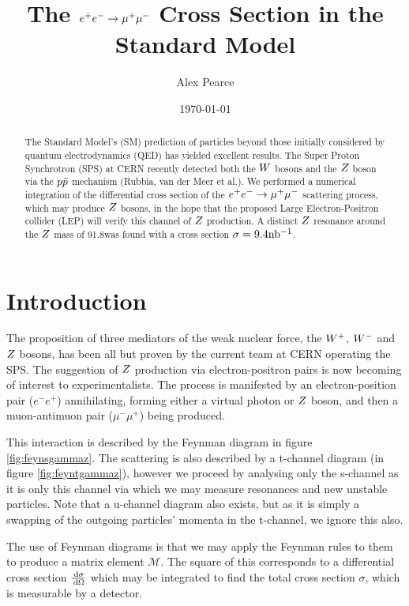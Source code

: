 \documentclass[]{article}
\begin{document}
\title{The $\ee \rarrow \mumu$ Cross Section in the Standard Model}
\author{Alex Pearce}
\date{\today}
\maketitle


\begin{abstract}
The Standard Model's (SM) prediction of particles beyond those initially considered by quantum electrodynamics (QED) has yielded excellent results. The Super Proton Synchrotron (SPS) at CERN recently detected both the $W $ bosons and the $Z $ boson via the $p\bar{p}$ mechanism (Rubbia, van der Meer et al.). We performed a numerical integration of the differential cross section of the $\ee \rarrow \mumu$ scattering process, which may produce $Z $ bosons, in the hope that the proposed Large Electron-Positron collider (LEP) will verify this channel of $Z $ production. A distinct $Z $ resonance around the $Z $ mass of 91.8\GeV was found with a cross section $\sigma=9.4\mbox{nb$^{-1}$} $.
\end{abstract}




\section{Introduction}\label{sec:intro}

The proposition of three mediators of the weak nuclear force, the $W^+ $, $W^- $ and $Z $ bosons, has been all but proven by the current team at CERN operating the SPS. The suggestion of $Z $ production via electron-positron pairs is now becoming of interest to experimentalists. The process is manifested by an electron-position pair ($e^{-}e^{+}$) annihilating, forming either a virtual photon or $Z $ boson, and then a muon-antimuon pair ($\mu^{-}\mu^{+}$) being produced.

This interaction is described by the Feynman diagram in figure \ref{fig:feynsgammaz}. The scattering is also described by a t-channel diagram (in figure \ref{fig:feyntgammaz}), however we proceed by analysing only the s-channel as it is only this channel via which we may measure resonances and new unstable particles. Note that a u-channel diagram also exists, but as it is simply a swapping of the outgoing particles' momenta in the t-channel, we ignore this also.

The use of Feynman diagrams is that we may apply the Feynman rules to them to produce a  matrix element $\mathcal{M}$. The square of this corresponds to a differential cross section $\frac{\,\operatorname{d}\!{\sigma}}{\,\operatorname{d}\!{\Omega}}$ which may be integrated to find the total cross section $\sigma$, which is measurable by a detector.
\end{document}
